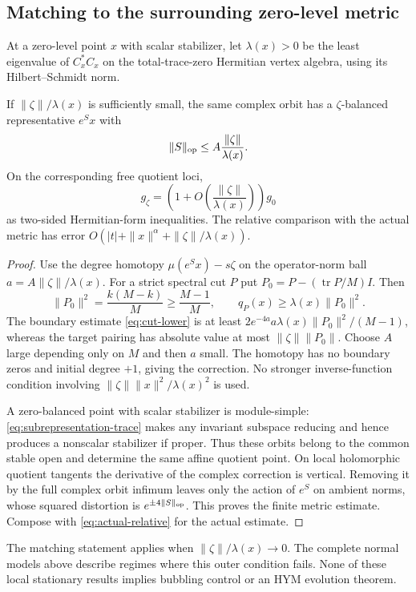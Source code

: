 \subsection{Matching to the surrounding zero-level metric}
At a zero-level point $x$ with scalar stabilizer, let $\lambda(x)>0$
be the least eigenvalue of $C_x^*C_x$ on the total-trace-zero
Hermitian vertex algebra, using its Hilbert--Schmidt norm.
\begin{proposition}\label{prop:outer-matching}
If $\|\zeta\|/\lambda(x)$ is sufficiently small, the same complex
orbit has a $\zeta$-balanced representative $e^Sx$ with
\[
 \|S\|_{\rm op}\le A\frac{\|\zeta\|}{\lambda(x)}.
\]
On the corresponding free quotient loci,
\[
 g_\zeta=\left(1+O\left(\frac{\|\zeta\|}{\lambda(x)}\right)\right)g_0
\]
as two-sided Hermitian-form inequalities.
The relative comparison with the actual metric has error
$O(|t|+\|x\|^\alpha+\|\zeta\|/\lambda(x))$.
\end{proposition}
\begin{proof}
Use the degree homotopy $\mu(e^Sx)-s\zeta$ on the operator-norm
ball $a=A\|\zeta\|/\lambda(x)$.
For a strict spectral cut $P$ put
$P_0=P-(\operatorname{tr}P/M)I$. Then
\[
 \|P_0\|^2=\frac{k(M-k)}M\ge\frac{M-1}M,\qquad
 q_P(x)\ge\lambda(x)\|P_0\|^2.
\]
The boundary estimate \eqref{eq:cut-lower} is at least
$2e^{-4a}a\lambda(x)\|P_0\|^2/(M-1)$, whereas the target pairing
has absolute value at most $\|\zeta\|\|P_0\|$.
Choose $A$ large depending only on $M$ and then $a$ small.
The homotopy has no boundary zeros and initial degree $+1$, giving
the correction. No stronger inverse-function condition involving
$\|\zeta\|\|x\|^2/\lambda(x)^2$ is used.

A zero-balanced point with scalar stabilizer is module-simple:
\eqref{eq:subrepresentation-trace} makes any invariant subspace
reducing and hence produces a nonscalar stabilizer if proper.
Thus these orbits belong to the common stable open and determine
the same affine quotient point.
On local holomorphic quotient tangents the derivative of the
complex correction is vertical. Removing it by the full complex
orbit infimum leaves only the action of $e^S$ on ambient norms,
whose squared distortion is $e^{\pm4\|S\|_{\rm op}}$.
This proves the finite metric estimate. Compose with
\eqref{eq:actual-relative} for the actual estimate.
\end{proof}
The matching statement applies when $\|\zeta\|/\lambda(x)\to0$.
The complete normal models above describe regimes where this
outer condition fails. None of these local stationary results
implies bubbling control or an HYM evolution theorem.

